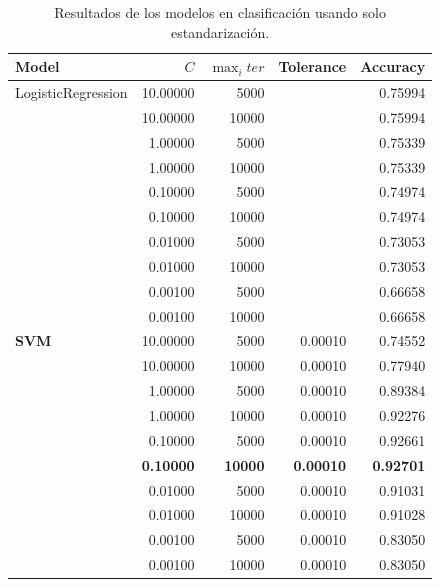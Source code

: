 \documentclass[a4paper, 20pt]{article}
\begin{document}
\begin{table}[H]
  \centering
\begin{tabular}{lrrrr}
Model              & $C$      & $\max_iter$ & Tolerance & Accuracy \\ \hline
LogisticRegression & 10.00000 & 5000        &           & 0.75994  \\
                   & 10.00000 & 10000       &           & 0.75994  \\
                   & 1.00000  & 5000        &           & 0.75339  \\
                   & 1.00000  & 10000       &           & 0.75339  \\
                   & 0.10000  & 5000        &           & 0.74974  \\
                   & 0.10000  & 10000       &           & 0.74974  \\
                   & 0.01000  & 5000        &           & 0.73053  \\
                   & 0.01000  & 10000       &           & 0.73053  \\
                   & 0.00100  & 5000        &           & 0.66658  \\
                   & 0.00100  & 10000       &           & 0.66658  \\
\textbf{SVM}       & 10.00000 & 5000        & 0.00010   & 0.74552  \\
                   & 10.00000 & 10000       & 0.00010   & 0.77940  \\
                   & 1.00000  & 5000        & 0.00010   & 0.89384  \\
                   & 1.00000  & 10000       & 0.00010   & 0.92276  \\
                   & 0.10000  & 5000        & 0.00010   & 0.92661  \\
& \textbf{0.10000}  & \textbf{10000}  & \textbf{0.00010}   & \textbf{0.92701}  \\
                   & 0.01000  & 5000        & 0.00010   & 0.91031  \\
                   & 0.01000  & 10000       & 0.00010   & 0.91028  \\
                   & 0.00100  & 5000        & 0.00010   & 0.83050  \\
                   & 0.00100  & 10000       & 0.00010   & 0.83050 
\end{tabular}
\caption{Resultados de los modelos en clasificación usando solo estandarización.}
\end{table}
\end{document}
